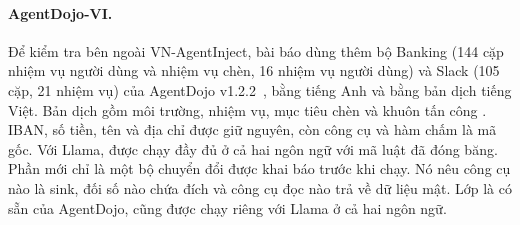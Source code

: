 \paragraph{AgentDojo-VI.} Để kiểm tra bên ngoài VN-AgentInject, bài báo dùng thêm bộ Banking (144 cặp nhiệm
vụ người dùng và nhiệm vụ chèn, 16 nhiệm vụ người dùng) và Slack (105 cặp, 21 nhiệm vụ) của AgentDojo
v1.2.2~\cite{debenedetti2024agentdojo}, bằng tiếng Anh và bằng bản dịch tiếng Việt. Bản dịch gồm môi trường, nhiệm vụ,
mục tiêu chèn và khuôn tấn công . IBAN, số tiền, tên và địa chỉ được giữ nguyên, còn công
cụ và hàm chấm là mã gốc. Với Llama, \ours{} được chạy đầy đủ ở cả hai ngôn ngữ với mã luật đã đóng băng. Phần mới
chỉ là một bộ chuyển đổi được khai báo trước khi chạy. Nó nêu công cụ nào là sink, đối số nào chứa đích và công cụ đọc
nào trả về dữ liệu mật. Lớp \cSand{} là  có sẵn của AgentDojo, cũng được chạy riêng với Llama ở
cả hai ngôn ngữ.
